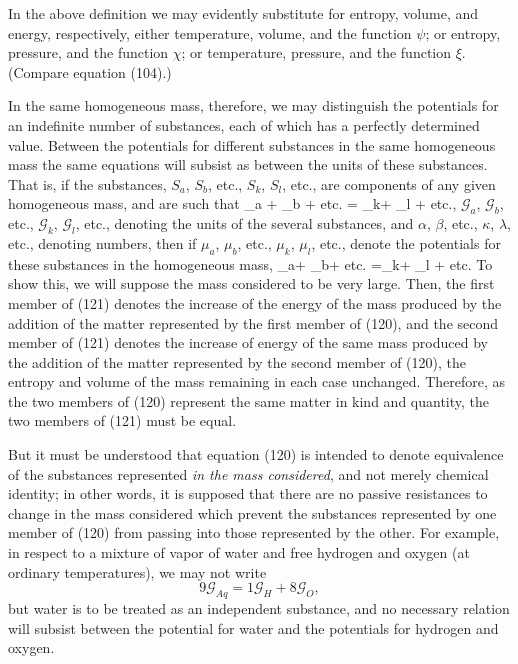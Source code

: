 \documentclass[12pt]{memoir}
\begin{document}
In the above definition we may evidently substitute for entropy, volume, and energy, respectively, either temperature, volume, and the function $\psi$; or entropy, pressure, and the function $\chi$; or temperature, pressure, and the function $\xi$. (Compare equation (104).)



In the same homogeneous mass, therefore, we may distinguish the potentials for an indefinite number of substances, each of which has a perfectly determined value.
Between the potentials for different substances in the same homogeneous mass the same equations will subsist as between the units of these substances.  That is, if the substances, $S_a$, $S_b$, etc., $S_k$, $S_l$, etc., are components of any given homogeneous mass, and are such that
\eqs \alpha {}_a +  \beta {}_b + etc. = \kappa {}_k+ \lambda {}_l + etc.,  \label{120}\eqe
$\mathcal{G}_a$, $\mathcal{G}_b$, etc., $\mathcal{G}_k$, $\mathcal{G}_l$, etc., denoting the units of the several substances, and $\alpha$, $\beta$, etc., $\kappa$, $\lambda$, etc., denoting numbers, then if $\mu_a$, $\mu_b$, etc., $\mu_k$, $\mu_l$, etc., denote the potentials for these substances in the homogeneous mass,
\eqs \alpha \mu_a+ \beta \mu_b+ etc. =\kappa \mu_k+ \lambda
\mu_l + etc.    \label{121}\eqe
To show this, we will suppose the mass considered to be very large. Then, the first member of (121) denotes the increase of the energy of the mass produced by the addition of the matter represented by the first member of (120), and the second member of (121) denotes the increase of energy of the same mass produced by the addition of the matter represented by the second member of (120), the entropy and volume of the mass remaining in each case unchanged. Therefore, as the two members of (120) represent the same matter in kind and quantity, the two members of (121) must be equal.


But it must be understood that equation (120) is intended to denote equivalence of the substances represented \textit{in the mass considered}, and not merely chemical identity; in other words, it is supposed that there are no passive resistances to change in the mass considered which prevent the substances represented by one member of (120) from passing into those represented by the other. For example, in respect to a mixture of vapor of water and free hydrogen and oxygen (at ordinary temperatures), we may not write
$$9 \mathcal{G}_{Aq} = 1 \mathcal{G}_H + 8 \mathcal{G}_O,$$
but water is to be treated as an independent substance, and no necessary relation will subsist between the potential for water and the potentials for hydrogen and oxygen.
\end{document}
